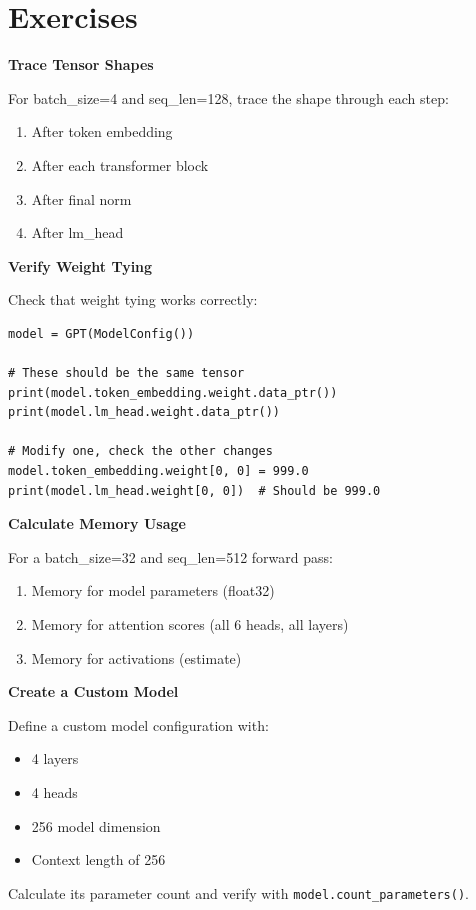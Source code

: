 \section{Exercises}

\begin{exercise}
\textbf{Trace Tensor Shapes}

For batch\_size=4 and seq\_len=128, trace the shape through each step:
\begin{enumerate}
    \item After token embedding
    \item After each transformer block
    \item After final norm
    \item After lm\_head
\end{enumerate}
\end{exercise}

\begin{exercise}
\textbf{Verify Weight Tying}

Check that weight tying works correctly:
\begin{lstlisting}[style=python, numbers=none]
model = GPT(ModelConfig())

# These should be the same tensor
print(model.token_embedding.weight.data_ptr())
print(model.lm_head.weight.data_ptr())

# Modify one, check the other changes
model.token_embedding.weight[0, 0] = 999.0
print(model.lm_head.weight[0, 0])  # Should be 999.0
\end{lstlisting}
\end{exercise}

\begin{exercise}
\textbf{Calculate Memory Usage}

For a batch\_size=32 and seq\_len=512 forward pass:
\begin{enumerate}
    \item Memory for model parameters (float32)
    \item Memory for attention scores (all 6 heads, all layers)
    \item Memory for activations (estimate)
\end{enumerate}
\end{exercise}

\begin{exercise}
\textbf{Create a Custom Model}

Define a custom model configuration with:
\begin{itemize}
    \item 4 layers
    \item 4 heads
    \item 256 model dimension
    \item Context length of 256
\end{itemize}

Calculate its parameter count and verify with \texttt{model.count\_parameters()}.
\end{exercise}

